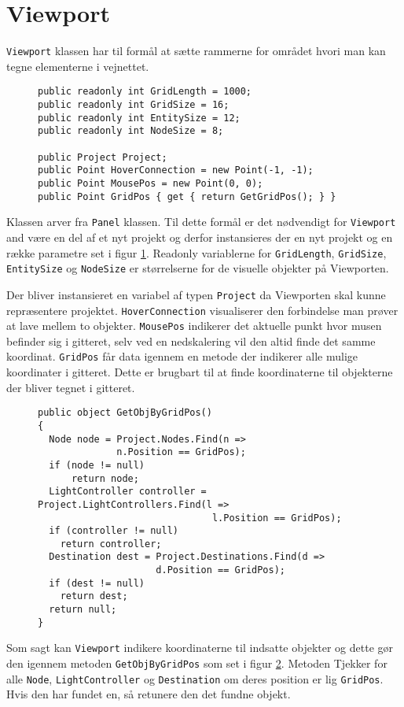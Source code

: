 \section{Viewport}\label{Viewport}
\texttt{Viewport} klassen har til formål at sætte rammerne for området hvori man kan tegne elementerne i vejnettet.

\begin{figure}[H]
\begin{lstlisting}
public readonly int GridLength = 1000;
public readonly int GridSize = 16;
public readonly int EntitySize = 12;
public readonly int NodeSize = 8;

public Project Project;
public Point HoverConnection = new Point(-1, -1);
public Point MousePos = new Point(0, 0);
public Point GridPos { get { return GetGridPos(); } }
\end{lstlisting}
\caption{}
\label{ViewportParameters}
\end{figure}

Klassen arver fra \texttt{Panel} klassen. Til dette formål er det nødvendigt for \texttt{Viewport} and være en del af et nyt projekt og derfor instansieres der en nyt projekt og en række parametre set i figur \ref{ViewportParameters}. Readonly variablerne for \texttt{GridLength}, \texttt{GridSize}, \texttt{EntitySize} og \texttt{NodeSize} er størrelserne for de visuelle objekter på Viewporten.

\vspace{5mm}

Der bliver instansieret en variabel af typen \texttt{Project} da Viewporten skal kunne repræsentere projektet. \texttt{HoverConnection} visualiserer den forbindelse man prøver at lave mellem to objekter. \texttt{MousePos} indikerer det aktuelle punkt hvor musen befinder sig i gitteret, selv ved en nedskalering vil den altid finde det samme koordinat. \texttt{GridPos} får data igennem en metode der indikerer alle mulige koordinater i gitteret. Dette er brugbart til at finde koordinaterne til objekterne der bliver tegnet i gitteret.

\begin{figure}[H]
\begin{lstlisting}
public object GetObjByGridPos()
{
  Node node = Project.Nodes.Find(n => 
              n.Position == GridPos);
  if (node != null)
      return node;
  LightController controller = Project.LightControllers.Find(l => 
                               l.Position == GridPos);
  if (controller != null)
    return controller;
  Destination dest = Project.Destinations.Find(d => 
                     d.Position == GridPos);
  if (dest != null)
    return dest;
  return null;
}
\end{lstlisting}
\caption{}
\label{ViewportGetObjByGridPos}
\end{figure}

Som sagt kan \texttt{Viewport} indikere koordinaterne til indsatte objekter og dette gør den igennem metoden \texttt{GetObjByGridPos} som set i figur \ref{ViewportGetObjByGridPos}. Metoden Tjekker for alle \texttt{Node}, \texttt{LightController} og \texttt{Destination} om deres position er lig \texttt{GridPos}. Hvis den har fundet en, så retunere den det fundne objekt.